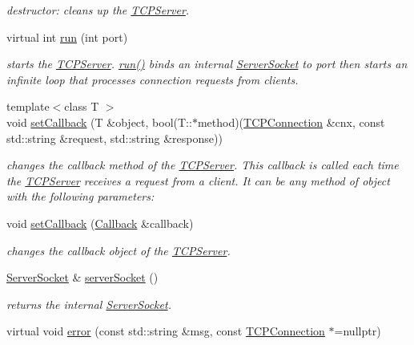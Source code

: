 \begin{DoxyCompactItemize}
\begin{DoxyCompactList}\small\item\em destructor\+: cleans up the \hyperlink{classcppu_1_1TCPServer}{T\+C\+P\+Server}. \end{DoxyCompactList}\item 
virtual int \hyperlink{classcppu_1_1TCPServer_a98e00d62745812b17bdee9f07f2070c4}{run} (int port)
\begin{DoxyCompactList}\small\item\em starts the \hyperlink{classcppu_1_1TCPServer}{T\+C\+P\+Server}. \hyperlink{classcppu_1_1TCPServer_a98e00d62745812b17bdee9f07f2070c4}{run()} binds an internal \hyperlink{classcppu_1_1ServerSocket}{Server\+Socket} to {\itshape port} then starts an infinite loop that processes connection requests from clients. \end{DoxyCompactList}\item 
{\footnotesize template$<$class T $>$ }\\void \hyperlink{classcppu_1_1TCPServer_a7d4fdb93439015934004755fde72945b}{set\+Callback} (T \&object, bool(T\+::$\ast$method)(\hyperlink{classcppu_1_1TCPConnection}{T\+C\+P\+Connection} \&cnx, const std\+::string \&request, std\+::string \&response))
\begin{DoxyCompactList}\small\item\em changes the callback method of the \hyperlink{classcppu_1_1TCPServer}{T\+C\+P\+Server}. This callback is called each time the \hyperlink{classcppu_1_1TCPServer}{T\+C\+P\+Server} receives a request from a client. It can be any method of {\itshape object} with the following parameters\+: \end{DoxyCompactList}\item 
void \hyperlink{classcppu_1_1TCPServer_a94d3d97b03d5e3e48609e405d8dd7897}{set\+Callback} (\hyperlink{structcppu_1_1TCPServer_1_1Callback}{Callback} \&callback)
\begin{DoxyCompactList}\small\item\em changes the callback object of the \hyperlink{classcppu_1_1TCPServer}{T\+C\+P\+Server}. \end{DoxyCompactList}\item 
\hypertarget{classcppu_1_1TCPServer_a6428b63a4440045050dba4f33bb454bf}{\hyperlink{classcppu_1_1ServerSocket}{Server\+Socket} \& \hyperlink{classcppu_1_1TCPServer_a6428b63a4440045050dba4f33bb454bf}{server\+Socket} ()}\label{classcppu_1_1TCPServer_a6428b63a4440045050dba4f33bb454bf}

\begin{DoxyCompactList}\small\item\em returns the internal \hyperlink{classcppu_1_1ServerSocket}{Server\+Socket}. \end{DoxyCompactList}\item 
\hypertarget{classcppu_1_1TCPServer_afc47ca4476d9c75d5ea88f73e2acd6d5}{virtual void \hyperlink{classcppu_1_1TCPServer_afc47ca4476d9c75d5ea88f73e2acd6d5}{error} (const std\+::string \&msg, const \hyperlink{classcppu_1_1TCPConnection}{T\+C\+P\+Connection} $\ast$=nullptr)}\label{classcppu_1_1TCPServer_afc47ca4476d9c75d5ea88f73e2acd6d5}


\end{DoxyCompactItemize}
